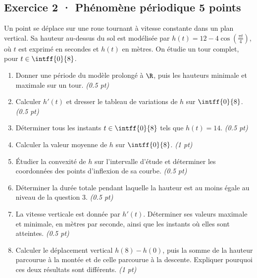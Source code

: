 \subsection*{Exercice 2 · Phénomène périodique \hfill 5 points}Un point se déplace sur une roue tournant à vitesse constante dans un plan vertical. Sa hauteur au-dessus du sol est modélisée par $h(t)=12-4\cos\left(\frac{\pi t}{4}\right)$, où $t$ est exprimé en secondes et $h(t)$ en mètres. On étudie un tour complet, pour $t\in\intff{0}{8}$.

\begin{enumerate}

\item Donner une période du modèle prolongé à $\R$, puis les hauteurs minimale et maximale sur un tour. \hfill\textit{(\num{0,5} pt)}

\item Calculer $h'(t)$ et dresser le tableau de variations de $h$ sur $\intff{0}{8}$. \hfill\textit{(\num{0,5} pt)}

\item Déterminer tous les instants $t\in\intff{0}{8}$ tels que $h(t)=14$. \hfill\textit{(\num{0,5} pt)}

\item Calculer la valeur moyenne de $h$ sur $\intff{0}{8}$. \hfill\textit{(1 pt)}

\item Étudier la convexité de $h$ sur l'intervalle d'étude et déterminer les coordonnées des points d'inflexion de sa courbe. \hfill\textit{(\num{0,5} pt)}

\item Déterminer la durée totale pendant laquelle la hauteur est au moins égale au niveau de la question 3. \hfill\textit{(\num{0,5} pt)}

\item La vitesse verticale est donnée par $h'(t)$. Déterminer ses valeurs maximale et minimale, en mètres par seconde, ainsi que les instants où elles sont atteintes. \hfill\textit{(\num{0,5} pt)}

\item Calculer le déplacement vertical $h(8)-h(0)$, puis la somme de la hauteur parcourue à la montée et de celle parcourue à la descente. Expliquer pourquoi ces deux résultats sont différents. \hfill\textit{(1 pt)}

\end{enumerate}

\mxnewpage{}

